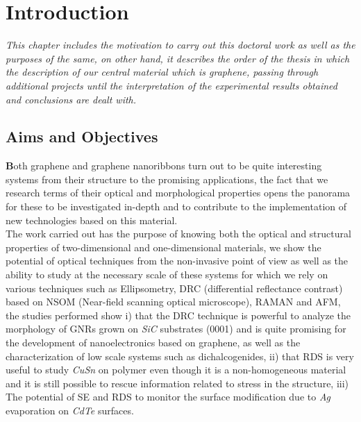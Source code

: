 \chapter{Introduction}
\label{chapter:Introduction}
\textit{This chapter includes the motivation to carry out this doctoral work as well as the purposes of the same, on other hand, it describes the order of the thesis in which the description of our central material which is graphene, passing through additional projects until the interpretation of the experimental results obtained and conclusions are dealt with.}
\vfill
\minitoc\newpage


\section{Aims and Objectives}
\vspace{-1cm}
\lettrine[lines=3, lraise=0.1, nindent=0mm, slope=0mm]{\textbf{B}}{}oth graphene and graphene nanoribbons turn out to be quite interesting systems from their structure to the promising applications, the fact that we research terms of their optical and morphological properties opens the panorama for these to be investigated in-depth and to contribute to the implementation of new technologies based on this material. \\

The work carried out has the purpose of knowing both the optical and structural properties of two-dimensional and one-dimensional materials, we show the potential of optical techniques from the non-invasive point of view as well as the ability to study at the necessary scale of these systems for which we rely on various techniques such as Ellipsometry, DRC (differential reflectance contrast) based on NSOM (Near-field scanning optical microscope), RAMAN and AFM, the studies performed show i) that the DRC technique is powerful to analyze the morphology of GNRs grown on \textit{SiC} substrates (0001) and is quite promising for the development of nanoelectronics based on graphene, as well as the characterization of low scale systems such as dichalcogenides, ii) that RDS is very useful to study \textit{CuSn} on polymer even though it is a non-homogeneous material and it is still possible to rescue information related to stress in the structure, iii) The potential of SE and RDS to monitor the surface modification due to \textit{Ag} evaporation on \textit{CdTe} surfaces. 

